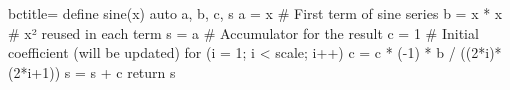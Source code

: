 
\begin{nxCodeBox}{bc}{title={}}
define sine(x) {
  auto a, b, c, s
  a = x              # First term of sine series
  b = x * x          # x² reused in each term
  s = a              # Accumulator for the result
  c = 1              # Initial coefficient (will be updated)
  for (i = 1; i < scale; i++) {
    c = c * (-1) * b / ((2*i)*(2*i+1))
    s = s + c
  }
  return s
}
\end{nxCodeBox}

